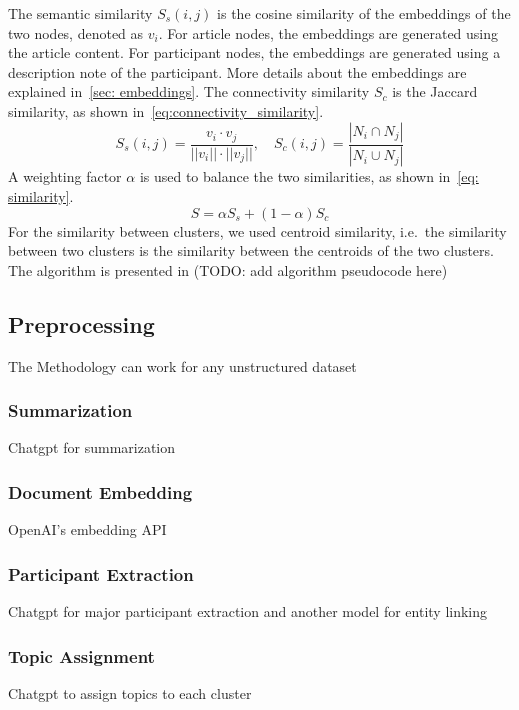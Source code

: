 The semantic similarity $S_s(i, j)$ is the cosine similarity of the embeddings of the two nodes, denoted as $v_i$.
For article nodes, the embeddings are generated using the article content.
For participant nodes, the embeddings are generated using a description note of the participant.
More details about the embeddings are explained in~\autoref{sec: embeddings}.
The connectivity similarity $S_c$ is the Jaccard similarity, as shown in~\autoref{eq:connectivity_similarity}.
\begin{equation}\label{eq:connectivity_similarity}
    S_s(i, j) = \frac{v_i \cdot v_j}{||v_i|| \cdot ||v_j||}, \quad
    S_c(i, j) = \frac{|N_i \cap N_j|}{|N_i \cup N_j|}
\end{equation}
A weighting factor $\alpha$ is used to balance the two similarities, as shown in~\autoref{eq: similarity}.
\begin{equation}\label{eq: similarity}
    S = \alpha S_s + (1-\alpha) S_c
\end{equation}
For the similarity between clusters, we used centroid similarity, i.e.\ the similarity between two clusters is the similarity between the centroids of the two clusters.
The algorithm is presented in (TODO: add algorithm pseudocode here)



\subsection{Preprocessing}
The Methodology can work for any unstructured dataset
\subsubsection{Summarization}
Chatgpt for summarization
\subsubsection{Document Embedding}\label{sec: embeddings}
OpenAI's embedding API
\subsubsection{Participant Extraction}\label{sec: participant_extraction}
Chatgpt for major participant extraction and another model for entity linking

\subsubsection{Topic Assignment}\label{sec: topic_assignment}
Chatgpt to assign topics to each cluster